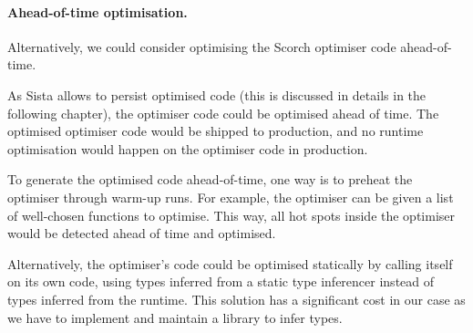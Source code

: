 \documentclass[a4paper,12pt,twoside]{../includes/ThesisStyle}
\begin{document}
\paragraph{Ahead-of-time optimisation.} 
Alternatively, we could consider optimising the Scorch optimiser code ahead-of-time.

As Sista allows to persist optimised code (this is discussed in details in the following chapter), the optimiser code could be optimised ahead of time. The optimised optimiser code would be shipped to production, and no runtime optimisation would happen on the optimiser code in production.

To generate the optimised code ahead-of-time, one way is to preheat the optimiser through warm-up runs. For example, the optimiser can be given a list of well-chosen functions to optimise. This way, all hot spots inside the optimiser would be detected ahead of time and optimised. 

Alternatively, the optimiser's code could be optimised statically by calling itself on its own code, using types inferred from a static type inferencer instead of types inferred from the runtime. This solution has a significant cost in our case as we have to implement and maintain a library to infer types.




\end{document}
